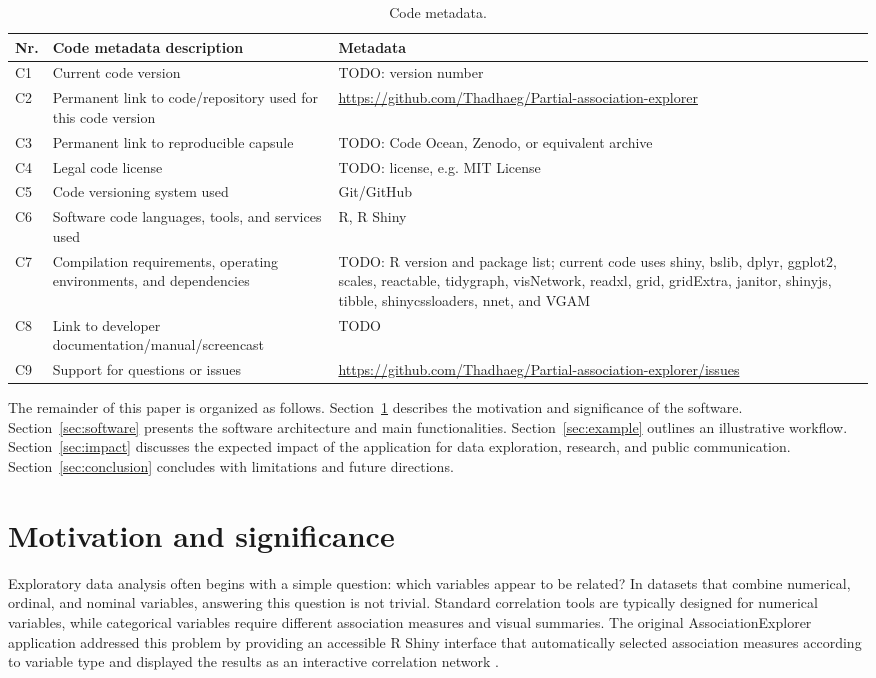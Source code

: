 \documentclass[11pt,a4paper]{article}
\begin{document}
\begin{table}[h]
\centering
\caption{Code metadata.}
\label{tab:metadata}
\begin{tabular}{p{}p{}p{}}
\toprule
Nr. & Code metadata description & Metadata \\
\midrule
C1 & Current code version & TODO: version number \\
C2 & Permanent link to code/repository used for this code version & \url{https://github.com/Thadhaeg/Partial-association-explorer} \\
C3 & Permanent link to reproducible capsule & TODO: Code Ocean, Zenodo, or equivalent archive \\
C4 & Legal code license & TODO: license, e.g. MIT License \\
C5 & Code versioning system used & Git/GitHub \\
C6 & Software code languages, tools, and services used & R, R Shiny \\
C7 & Compilation requirements, operating environments, and dependencies & TODO: R version and package list; current code uses shiny, bslib, dplyr, ggplot2, scales, reactable, tidygraph, visNetwork, readxl, grid, gridExtra, janitor, shinyjs, tibble, shinycssloaders, nnet, and VGAM \\
C8 & Link to developer documentation/manual/screencast & TODO \\
C9 & Support for questions or issues & \url{https://github.com/Thadhaeg/Partial-association-explorer/issues} \\
\bottomrule
\end{tabular}
\end{table}

The remainder of this paper is organized as follows. Section~\ref{sec:motivation} describes the motivation and significance of the software. Section~\ref{sec:software} presents the software architecture and main functionalities. Section~\ref{sec:example} outlines an illustrative workflow. Section~\ref{sec:impact} discusses the expected impact of the application for data exploration, research, and public communication. Section~\ref{sec:conclusion} concludes with limitations and future directions.

\section{Motivation and significance}
\label{sec:motivation}

Exploratory data analysis often begins with a simple question: which variables appear to be related? In datasets that combine numerical, ordinal, and nominal variables, answering this question is not trivial. Standard correlation tools are typically designed for numerical variables, while categorical variables require different association measures and visual summaries. The original AssociationExplorer application addressed this problem by providing an accessible R Shiny interface that automatically selected association measures according to variable type and displayed the results as an interactive correlation network \cite{soetewey2026associationexplorer}.
\end{document}
